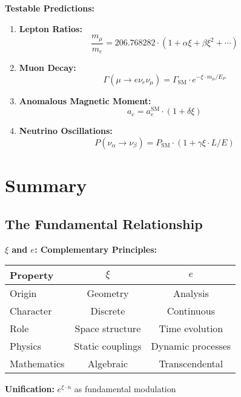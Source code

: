 \documentclass[12pt,a4paper]{article}
\begin{document}
	\begin{application}
		\textbf{Testable Predictions:}
		
		\begin{enumerate}
			\item \textbf{Lepton Ratios:}
			\begin{equation}
				\frac{m_\mu}{m_e} = 206.768282 \cdot (1 + \alpha \xi + \beta \xi^2 + \cdots)
			\end{equation}
			
			\item \textbf{Muon Decay:}
			\begin{equation}
				\Gamma(\mu \to e\nu_e\nu_\mu) = \Gamma_{\text{SM}} \cdot e^{-\xi \cdot m_\mu/E_P}
			\end{equation}
			
			\item \textbf{Anomalous Magnetic Moment:}
			\begin{equation}
				a_e = a_e^{\text{SM}} \cdot (1 + \delta \xi)
			\end{equation}
			
			\item \textbf{Neutrino Oscillations:}
			\begin{equation}
				P(\nu_\alpha \to \nu_\beta) = P_{\text{SM}} \cdot (1 + \gamma \xi \cdot L/E)
			\end{equation}
		\end{enumerate}
	\end{application}
	
	\section{Summary}
	
	\subsection{The Fundamental Relationship}
	
	\begin{insight}
		\textbf{$\xi$ and $e$: Complementary Principles:}
		
		\begin{center}
			\begin{tabular}{lcc}
				\toprule
				\textbf{Property} & \textbf{$\xi$} & \textbf{$e$} \\
				\midrule
				Origin & Geometry & Analysis \\
				Character & Discrete & Continuous \\
				Role & Space structure & Time evolution \\
				Physics & Static couplings & Dynamic processes \\
				Mathematics & Algebraic & Transcendental \\
				\bottomrule
			\end{tabular}
		\end{center}
		
		\textbf{Unification:} $e^{\xi \cdot n}$ as fundamental modulation
	\end{insight}
	
\end{document}
